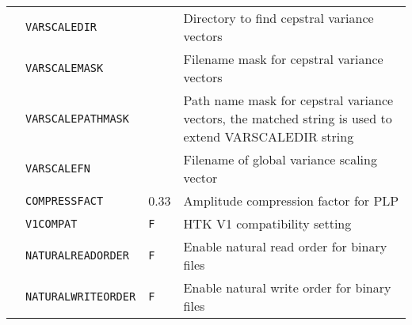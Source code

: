 \begin{center}
\begin{supertabular}{|p{1.4cm}|l|l|p{6.6cm}|}
  & \texttt{VARSCALEDIR} &  & Directory to find cepstral variance vectors  \\ 
  & \texttt{VARSCALEMASK} &  & Filename mask for cepstral variance vectors  \\ 
  & \texttt{VARSCALEPATHMASK} &  & Path name mask for cepstral variance vectors, the matched string is used to extend VARSCALEDIR string\\ 
  & \texttt{VARSCALEFN} &  & Filename of global variance scaling vector \\ 
  & \texttt{COMPRESSFACT} & 0.33 & Amplitude compression factor for PLP \\ \hline

   
  & \texttt{V1COMPAT} & \texttt{F} & HTK V1 compatibility setting \\ \hline



  & \texttt{NATURALREADORDER} & \texttt{F} & Enable natural read order for binary files \\  
  & \texttt{NATURALWRITEORDER} & \texttt{F} & Enable natural write order for binary files \\ \hline


\end{supertabular}
\end{center}
